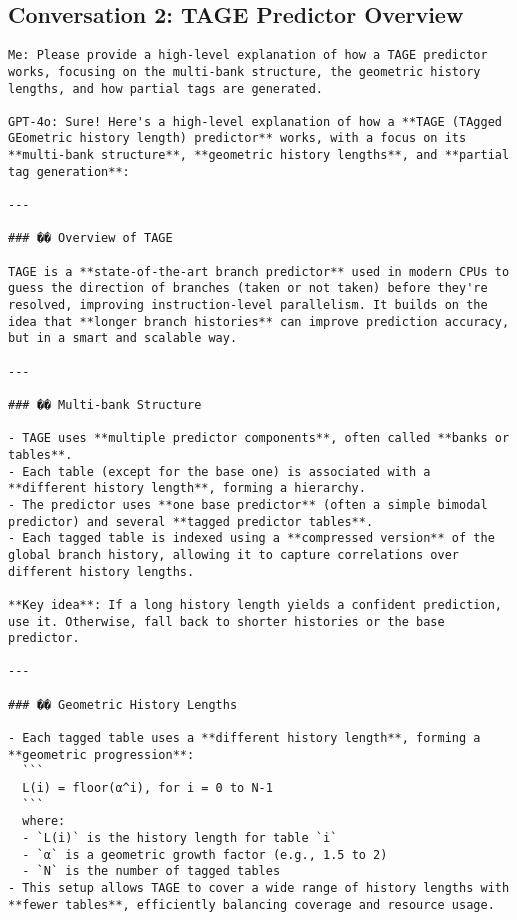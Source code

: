 \documentclass[11pt]{article}
\begin{document}
\subsection{Conversation 2: TAGE Predictor Overview}
\begin{verbatim}
Me: Please provide a high-level explanation of how a TAGE predictor works, focusing on the multi-bank structure, the geometric history lengths, and how partial tags are generated.

GPT-4o: Sure! Here's a high-level explanation of how a **TAGE (TAgged GEometric history length) predictor** works, with a focus on its **multi-bank structure**, **geometric history lengths**, and **partial tag generation**:

---

### �� Overview of TAGE

TAGE is a **state-of-the-art branch predictor** used in modern CPUs to guess the direction of branches (taken or not taken) before they're resolved, improving instruction-level parallelism. It builds on the idea that **longer branch histories** can improve prediction accuracy, but in a smart and scalable way.

---

### �� Multi-bank Structure

- TAGE uses **multiple predictor components**, often called **banks or tables**.
- Each table (except for the base one) is associated with a **different history length**, forming a hierarchy.
- The predictor uses **one base predictor** (often a simple bimodal predictor) and several **tagged predictor tables**.
- Each tagged table is indexed using a **compressed version** of the global branch history, allowing it to capture correlations over different history lengths.

**Key idea**: If a long history length yields a confident prediction, use it. Otherwise, fall back to shorter histories or the base predictor.

---

### �� Geometric History Lengths

- Each tagged table uses a **different history length**, forming a **geometric progression**:
  ```
  L(i) = floor(α^i), for i = 0 to N-1
  ```
  where:
  - `L(i)` is the history length for table `i`
  - `α` is a geometric growth factor (e.g., 1.5 to 2)
  - `N` is the number of tagged tables
- This setup allows TAGE to cover a wide range of history lengths with **fewer tables**, efficiently balancing coverage and resource usage.


\end{verbatim}
\end{document}
